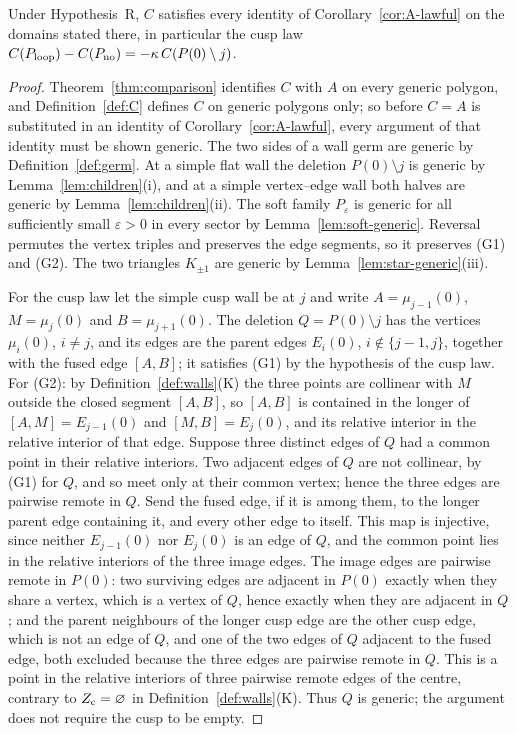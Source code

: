 \begin{corollary}\label{cor:C-inherits}\leanok
Under Hypothesis~R, $C$ satisfies every identity of
Corollary~\ref{cor:A-lawful} on the domains stated there, in particular
the cusp law
$C(P_{\rm loop})-C(P_{\rm no})=-\kappa\,C(P(0)\setminus j)$.

\end{corollary}
\begin{proof}\leanok{}
Theorem~\ref{thm:comparison} identifies $C$ with $A$ on every generic
polygon, and Definition~\ref{def:C} defines $C$ on generic polygons only;
so before $C=A$ is substituted in an identity of
Corollary~\ref{cor:A-lawful}, every argument of that identity must be
shown generic. The two sides of a wall germ are generic by
Definition~\ref{def:germ}. At a simple flat wall the deletion
$P(0)\setminus j$ is generic by Lemma~\ref{lem:children}(i), and at a
simple vertex--edge wall both halves are generic by
Lemma~\ref{lem:children}(ii). The soft family $P_\varepsilon$ is generic
for all sufficiently small $\varepsilon>0$ in every sector by
Lemma~\ref{lem:soft-generic}. Reversal permutes the vertex triples and
preserves the edge segments, so it preserves (G1) and (G2). The two
triangles $K_{\pm1}$ are generic by Lemma~\ref{lem:star-generic}(iii).

For the cusp law let the simple cusp wall be at $j$ and write
$A=\mu_{j-1}(0)$, $M=\mu_j(0)$ and $B=\mu_{j+1}(0)$. The deletion
$Q=P(0)\setminus j$ has the vertices $\mu_i(0)$, $i\neq j$, and its edges
are the parent edges $E_i(0)$, $i\notin\{j-1,j\}$, together with the fused
edge $[A,B]$; it satisfies (G1) by the hypothesis of the cusp law. For (G2):
by Definition~\ref{def:walls}(K) the three points are collinear with $M$
outside the closed segment $[A,B]$, so $[A,B]$ is contained in the longer of
$[A,M]=E_{j-1}(0)$ and $[M,B]=E_j(0)$, and its relative interior in the
relative interior of that edge. Suppose three distinct edges of $Q$ had a
common point in their relative interiors. Two adjacent edges of $Q$ are not
collinear, by (G1) for $Q$, and so meet only at their common vertex; hence
the three edges are pairwise remote in $Q$. Send the fused edge, if it is
among them, to the longer parent edge containing it, and every other edge
to itself. This map is injective, since neither $E_{j-1}(0)$ nor $E_j(0)$
is an edge of $Q$, and the common point lies in the relative interiors of
the three image edges. The image edges are pairwise remote in $P(0)$: two
surviving edges are adjacent in $P(0)$ exactly when they share a vertex,
which is a vertex of $Q$, hence exactly when they are adjacent in $Q$; and
the parent neighbours of the longer cusp edge are the other cusp edge,
which is not an edge of $Q$, and one of the two edges of $Q$ adjacent to
the fused edge, both excluded because the three edges are pairwise remote
in $Q$. This is a point in the relative interiors of three pairwise remote
edges of the centre, contrary to $Z_{\rm c}=\varnothing$ in
Definition~\ref{def:walls}(K). Thus $Q$ is generic; the argument does not
require the cusp to be empty.


\end{proof}
